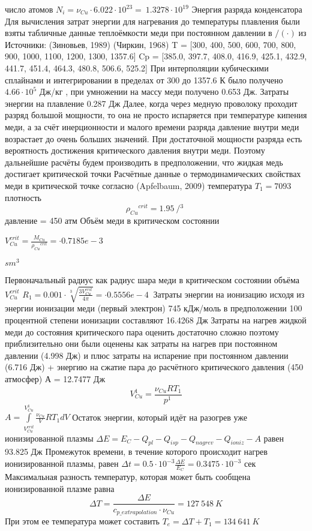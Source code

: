 ﻿\documentclass{article}
\begin{document}
число атомов ${{N}_{i}}={{\nu }_{Cu}}\cdot 6.022\cdot {{10}^{23}}=\ 1.3278\cdot {{10}^{19}}$ 
Энергия разряда конденсатора  
Для вычисления затрат энергии для нагревания до температуры плавления были взяты табличные данные теплоёмкости меди при постоянном давлении в ${}/{\left( \cdot  \right)}\;$из  
Источники: (Зиновьев, 1989)  (Чиркин, 1968)
T   = [300,     400,    500,    600,    700,     800,    900,    1000,   1100,  1200,  1300, 1357.6]
Cp = [385.0, 397.7, 408.0, 416.9, 425.1, 432.9, 441.7, 451.4, 464.3, 480.8, 506.6, 525.2] 
При интерполяции кубическими сплайнами и интегрировании в пределах от 300 до 1357.6 К было получено $4.66\cdot {{10}^{5}}$ Дж/кг , при умножении на массу меди получено 0.653 Дж. Затраты энергии на плавление 0.287 Дж
Далее, когда через медную проволоку проходит разряд большой мощности, то она не просто испаряется при температуре кипения меди, а за счёт инерционности и малого времени разряда давление внутри меди возрастает до очень больших значений. При достаточной мощности разряда есть вероятность достижения критического давления внутри меди.  Поэтому дальнейшие расчёты будем производить в предположении, что жидкая медь достигает критической точки
Расчётные данные о термодинамических свойствах меди в критической точке согласно (Apfelbaum, 2009) температура ${{T}_{1}}=7093\ $плотность \[{{\rho }_{Cu}}^{crit}=1.95\ {}/{{{}^{3}}}\;\] давление = 450 атм
Объём меди в критическом состоянии

 $V_{Cu}^{crit}=\frac{{{M}_{Cu}}}{{{\rho }_{Cu}}^{crit}}=\cdot{0.7185e-3}$

${sm}^{3}$

Первоначальный радиус как радиус шара меди в критическом состоянии объёма $V_{Cu}^{crit}$
${{R}_{1}}=0.001\cdot \sqrt[3]{\frac{3V_{Cu}^{crit}}{4\pi }}=\cdot{0.5556e-4}\ $ 
Затраты энергии на ионизацию исходя из энергии ионизации меди (первый электрон) 745 кДж/моль в предположении 100 процентной степени ионизации составляют 16.4268 Дж
Затраты на нагрев жидкой меди до состояния критического пара оценить достаточно сложно поэтому приблизительно они были оценены как затраты на нагрев при постоянном давлении (4.998 Дж) и плюс затраты на испарение при постоянном давлении (6.716 Дж) + энергию на сжатие пара до расчётного критического давления (450 атмосфер) А = 12.7477 Дж
\[V_{Cu}^{1\ }=\frac{{{\nu }_{Cu}}R{{T}_{1}}}{{{p}^{1\ }}}\] 
$A=\int\limits_{V_{Cu}^{crit}}^{V_{Cu}^{1\ }}{\frac{{{\nu }_{Cu}}}{V}R{{T}_{1}}dV}$ 
Остаток энергии, который идёт на разогрев уже ионизированной плазмы
$\Delta E={{E}_{C}}-{{Q}_{pl}}-{{Q}_{isp}}-{{Q}_{nagrev}}-{{Q}_{ioniz}}-A$ 
равен 93.825 Дж
Промежуток времени, в течение которого происходит нагрев ионизированной плазмы, равен 
$\Delta t=0.5\cdot {{10}^{-3}}\frac{\Delta E}{{{E}_{C}}}=0.3475\cdot {{10}^{-3}}$ сек
Максимальная разность температур, которая может быть сообщена ионизированной плазме равна \[\Delta T=\frac{\Delta E}{{{c}_{p\_extrapolation}}\cdot {{\nu }_{Cu}}}=127\ 548\ K\] 
При этом ее температура может составить ${{T}_{e}}=\Delta T+{{T}_{1}}=134\ 641\ K$ 
\end{document}
